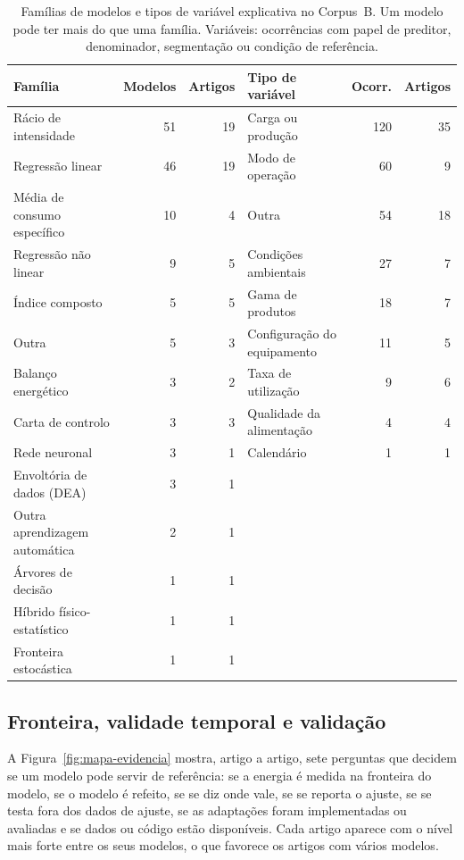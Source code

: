 \begin{table}[htbp]
  \centering
  \footnotesize
  \caption[Modelos e variáveis explicativas no Corpus B]{Famílias de modelos
  e tipos de variável explicativa no Corpus~B. Um modelo pode ter mais do que
  uma família. Variáveis: ocorrências com papel de preditor, denominador,
  segmentação ou condição de referência.}
  \label{tab:b-modelos}
  \begin{tabular}{lrr@{\hspace{2.5em}}lrr}
    \toprule
    Família & Modelos & Artigos & Tipo de variável & Ocorr. & Artigos \\
    \midrule
    Rácio de intensidade & 51 & 19 & Carga ou produção & 120 & 35 \\
    Regressão linear & 46 & 19 & Modo de operação & 60 & 9 \\
    Média de consumo específico & 10 & 4 & Outra & 54 & 18 \\
    Regressão não linear & 9 & 5 & Condições ambientais & 27 & 7 \\
    Índice composto & 5 & 5 & Gama de produtos & 18 & 7 \\
    Outra & 5 & 3 & Configuração do equipamento & 11 & 5 \\
    Balanço energético & 3 & 2 & Taxa de utilização & 9 & 6 \\
    Carta de controlo & 3 & 3 & Qualidade da alimentação & 4 & 4 \\
    Rede neuronal & 3 & 1 & Calendário & 1 & 1 \\
    Envoltória de dados (DEA) & 3 & 1 & & & \\
    Outra aprendizagem automática & 2 & 1 & & & \\
    Árvores de decisão & 1 & 1 & & & \\
    Híbrido físico-estatístico & 1 & 1 & & & \\
    Fronteira estocástica & 1 & 1 & & & \\
    \bottomrule
  \end{tabular}
\end{table}

\subsection{Fronteira, validade temporal e validação}
\label{sec:b-fronteira-validade}

A Figura~\ref{fig:mapa-evidencia} mostra, artigo a artigo, sete perguntas que
decidem se um modelo pode servir de referência: se a energia é medida na
fronteira do modelo, se o modelo é refeito, se se diz onde vale, se se
reporta o ajuste, se se testa fora dos dados de ajuste, se as adaptações
foram implementadas ou avaliadas e se dados ou código estão disponíveis.
Cada artigo aparece com o nível mais forte entre os seus modelos, o que
favorece os artigos com vários modelos.

